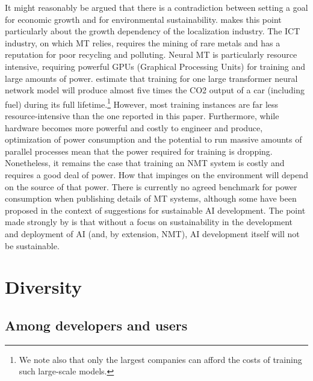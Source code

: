 \documentclass[output=paper]{langscibook}
\begin{document}
It might reasonably be argued that there is a contradiction between setting a goal for economic growth and for environmental sustainability. \citet{Cronin2017} makes this point particularly about the growth dependency of the localization industry. The ICT industry, on which MT relies, requires the mining of rare metals and has a reputation for poor recycling and polluting. Neural MT is particularly resource intensive, requiring powerful GPUs (Graphical Processing Units) for training and large amounts of power. \citet{StrubellMcCallum2019} estimate that training for one large transformer neural network model will produce almost five times the CO2 output of a car (including fuel) during its full lifetime.\footnote{We note also that only the largest companies can afford the costs of training such large-scale models.} However, most training instances are far less resource-intensive than the one reported in this paper. Furthermore, while hardware becomes more powerful and costly to engineer and produce, optimization of power consumption and the potential to run massive amounts of parallel processes mean that the power required for training is dropping. Nonetheless, it remains the case that training an NMT system is costly and requires a good deal of power. How that impinges on the environment will depend on the source of that power. There is currently no agreed benchmark for power consumption when publishing details of MT systems, although some have been proposed in the context of suggestions for sustainable AI development. The point made strongly by \citet{VanWynsberghe2021} is that without a focus on sustainability in the development and deployment of AI (and, by extension, NMT), AI development itself will not be sustainable.

\section{Diversity}\label{sec:moorkens:5}\largerpage[2]
\subsection{Among developers and users}\label{sec:moorkens:5.1}
\end{document}
